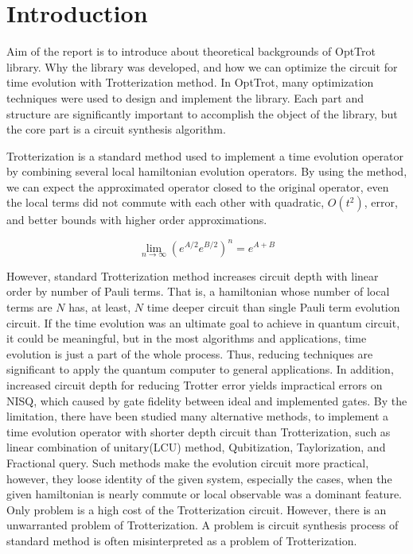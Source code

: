 \documentclass[a4paper,12pt]{article}
\begin{document}
\tableofcontents

\section{Introduction}

Aim of the report is to introduce about theoretical backgrounds of
OptTrot library. Why the library was developed, and how we can optimize 
the circuit for time evolution with Trotterization method.
In OptTrot, many optimization techniques were used to design and implement
the library.
Each part and structure are significantly important to accomplish the object 
of the library, but the core part is a circuit synthesis algorithm. 

Trotterization is a standard method used to implement a time evolution operator 
by combining several local hamiltonian evolution operators.
By using the method, we can expect the approximated operator closed to the original
operator, even the local terms did not commute with each other with quadratic, $O(t^2)$, error,
and better bounds with higher order approximations\cite{suzuki_finding_2005}.

\begin{equation}
    \lim_{n \rightarrow \infty} (e^{A/2} e^{B/2})^n = e^{A+B}
    \label{eq:Trotterization}
\end{equation}

However, standard Trotterization method increases circuit depth with linear order 
by number of Pauli terms. That is, a hamiltonian whose number of local terms are $N$
has, at least, $N$ time deeper circuit than single Pauli term evolution circuit.
If the time evolution was an ultimate goal to achieve in quantum circuit, 
it could be meaningful, but in the most algorithms and applications, time evolution 
is just a part of the whole process. 
Thus, reducing techniques are significant to apply the quantum computer to general applications.
In addition, increased circuit depth for reducing Trotter error yields 
impractical errors on NISQ, which caused by gate fidelity between ideal and implemented gates.
By the limitation, there have been studied many alternative methods, to implement a time evolution operator 
with shorter depth circuit than Trotterization, 
such as linear combination of unitary(LCU) method\cite{dewolf2023quantumcomputinglecturenotes}, Qubitization\cite{Low_2019}, 
Taylorization\cite{PhysRevLett.114.090502}, and Fractional query\cite{Berry_2014}.
Such methods make the evolution circuit more practical, however, they loose 
identity of the given system, especially the cases, when the given hamiltonian is nearly commute
or local observable was a dominant feature\cite{childs_theory_2021}. 
Only problem is a high cost of the Trotterization circuit. 
However, there is an unwarranted problem of Trotterization. 
A problem is circuit synthesis process of standard method\cite{nielsen2010quantum}
is often misinterpreted as a problem of Trotterization.
\end{document}
